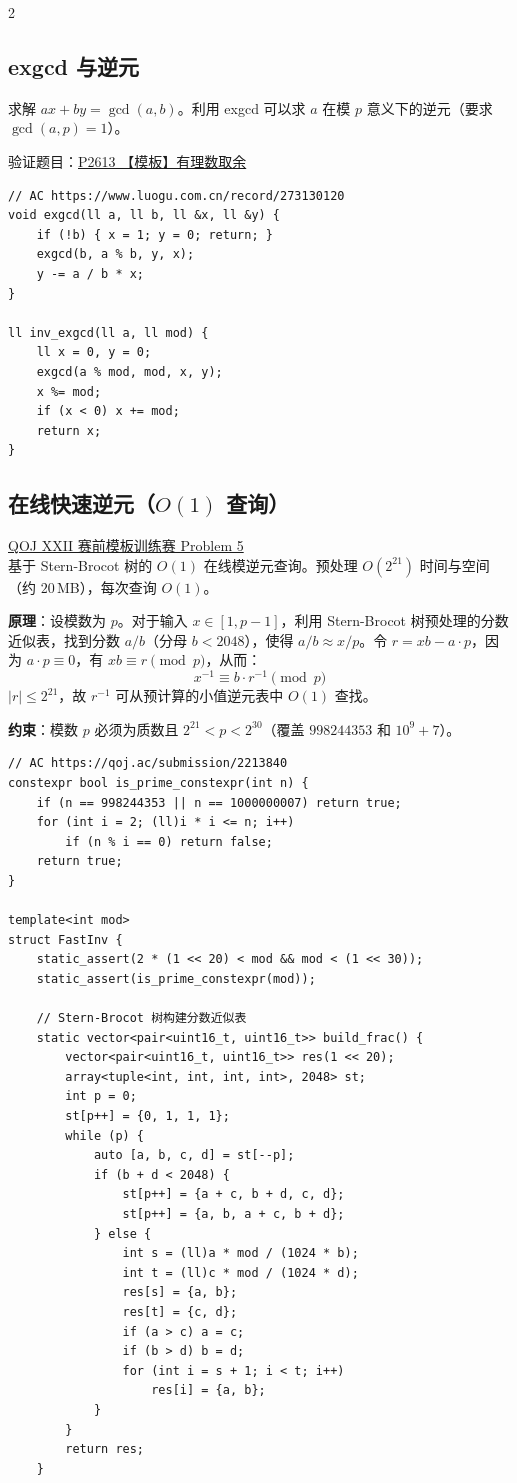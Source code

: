 \begin{multicols*}{2}
		\subsection{exgcd 与逆元}

		求解 $ax + by = \gcd(a, b)$。利用 exgcd 可以求 $a$ 在模 $p$ 意义下的逆元（要求 $\gcd(a, p) = 1$）。

		验证题目：\href{https://www.luogu.com.cn/problem/P2613}{P2613 【模板】有理数取余}

		\begin{verbatim}
// AC https://www.luogu.com.cn/record/273130120
void exgcd(ll a, ll b, ll &x, ll &y) {
	if (!b) { x = 1; y = 0; return; }
	exgcd(b, a % b, y, x);
	y -= a / b * x;
}

ll inv_exgcd(ll a, ll mod) {
	ll x = 0, y = 0;
	exgcd(a % mod, mod, x, y);
	x %= mod;
	if (x < 0) x += mod;
	return x;
}
		\end{verbatim}

		\subsection{在线快速逆元（$O(1)$ 查询）}

		\href{https://qoj.ac/contest/2646/problem/5}{QOJ XXII 赛前模板训练赛 Problem 5} \\

		基于 Stern-Brocot 树的 $O(1)$ 在线模逆元查询。预处理 $O(2^{21})$ 时间与空间（约 $20\,$MB），每次查询 $O(1)$。

		\textbf{原理}：设模数为 $p$。对于输入 $x \in [1, p-1]$，利用 Stern-Brocot 树预处理的分数近似表，找到分数 $a/b$（分母 $b < 2048$），使得 $a/b \approx x / p$。令 $r = xb - a \cdot p$，因为 $a \cdot p \equiv 0$，有 $xb \equiv r \pmod{p}$，从而：
		$$x^{-1} \equiv b \cdot r^{-1} \pmod{p}$$
		$|r| \le 2^{21}$，故 $r^{-1}$ 可从预计算的小值逆元表中 $O(1)$ 查找。

		\textbf{约束}：模数 $p$ 必须为质数且 $2^{21} < p < 2^{30}$（覆盖 $998244353$ 和 $10^9+7$）。

		\begin{verbatim}
// AC https://qoj.ac/submission/2213840
constexpr bool is_prime_constexpr(int n) {
	if (n == 998244353 || n == 1000000007) return true;
	for (int i = 2; (ll)i * i <= n; i++)
		if (n % i == 0) return false;
	return true;
}

template<int mod>
struct FastInv {
	static_assert(2 * (1 << 20) < mod && mod < (1 << 30));
	static_assert(is_prime_constexpr(mod));

	// Stern-Brocot 树构建分数近似表
	static vector<pair<uint16_t, uint16_t>> build_frac() {
		vector<pair<uint16_t, uint16_t>> res(1 << 20);
		array<tuple<int, int, int, int>, 2048> st;
		int p = 0;
		st[p++] = {0, 1, 1, 1};
		while (p) {
			auto [a, b, c, d] = st[--p];
			if (b + d < 2048) {
				st[p++] = {a + c, b + d, c, d};
				st[p++] = {a, b, a + c, b + d};
			} else {
				int s = (ll)a * mod / (1024 * b);
				int t = (ll)c * mod / (1024 * d);
				res[s] = {a, b};
				res[t] = {c, d};
				if (a > c) a = c;
				if (b > d) b = d;
				for (int i = s + 1; i < t; i++)
					res[i] = {a, b};
			}
		}
		return res;
	}


\end{verbatim}
\end{multicols*}
